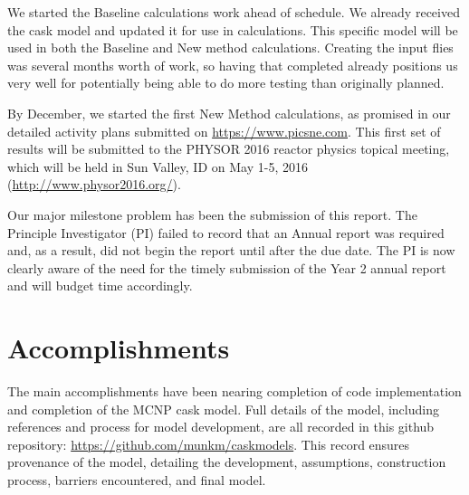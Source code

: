 \documentclass[12pt]{article}
\begin{document}
We started the Baseline calculations work ahead of schedule. 
We already received the cask model and updated it for use in calculations. 
This specific model will be used in both the Baseline and New method calculations.  Creating the input flies was several months worth of work, so having that completed already positions us very well for potentially being able to do more testing than originally planned. 

By December, we started the first New Method calculations, as promised in our detailed activity plans submitted on \href{https://www.picsne.com}{https://www.picsne.com}. 
This first set of results will be submitted to the PHYSOR 2016 reactor physics topical meeting, which will be held in Sun Valley, ID on May 1-5, 2016 \\(\href{http://www.physor2016.org/}{http://www.physor2016.org/}). 

Our major milestone problem has been the submission of this report. 
The Principle Investigator (PI) failed to record that an Annual report was required and, as a result, did not begin the report until after the due date. 
The PI is now clearly aware of the need for the timely submission of the Year 2 annual report and will budget time accordingly.


\section{Accomplishments}
\label{sect::accomplishments}

The main accomplishments have been nearing completion of code implementation and completion of the MCNP cask model. Full details of the model, including references and process for model development, are all recorded in this github repository: \href{https://github.com/munkm/caskmodels}{https://github.com/munkm/caskmodels}. This record ensures provenance of the model, detailing the development, assumptions, construction process, barriers encountered, and final model. 
\end{document}
